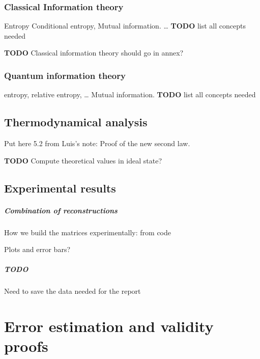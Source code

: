 \documentclass[10pt]{report}
\theoremstyle{plain}
\theoremstyle{definition}
\theoremstyle{remark}
\newcommand{\TODO}{\textbf{TODO}}
\begin{document}
\subsection{Classical Information theory}

Entropy
Conditional entropy,
Mutual information.
\ldots
\TODO{} list all concepts needed

\TODO{} Classical information theory should go in annex?

\subsection{Quantum information theory}

entropy, relative entropy, \ldots
Mutual information.
\TODO{} list all concepts needed

\section{Thermodynamical analysis}



Put here 5.2 from Luis's note: Proof of the new second law.

\TODO{} Compute theoretical values in ideal state?


\section{Experimental results}

\paragraph{Combination of reconstructions} How we build the matrices
experimentally: from code

Plots and error bars?

\paragraph{TODO} Need to save the data needed for the report

\chapter{Error estimation and validity proofs}
\end{document}
